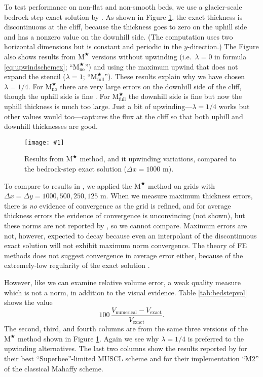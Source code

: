 \documentclass[twocolumn,letterpaper]{igs}
\newcommand{\onecol}[1]{\texttt{[image: \#1]}}
\newcommand{\Mstar}{$\text{M}^{\bigstar}$\xspace}
\newcommand{\Mstarnoup}{$\text{M}^{\bigstar}_{\text{no}}$\xspace}
\newcommand{\Mstarfullup}{$\text{M}^{\bigstar}_{\text{full}}$\xspace}
\begin{document}
To test performance on non-flat and non-smooth beds, we use a glacier-scale bedrock-step exact solution by \cite{JaroschSchoofAnslow2013}.  As shown in Figure \ref{fig:bedstepprofiles}, the exact thickness is discontinuous at the cliff, because the thickness goes to zero on the uphill side and has a nonzero value on the downhill side.  (The computation uses two horizontal dimensions but is constant and periodic in the $y$-direction.)  The Figure also shows results from \Mstar versions without upwinding (i.e.~$\lambda=0$ in formula \eqref{eq:upwindschemex}; ``\Mstarnoup'') and using the maximum upwind that does not expand the stencil ($\lambda=1$; ``\Mstarfullup'').  These results explain why we have chosen $\lambda=1/4$.  For \Mstarnoup there are very large errors on the downhill side of the cliff, though the uphill side is fine \citep{JaroschSchoofAnslow2013}.  For \Mstarfullup the downhill side is fine but now the uphill thickness is much too large.  Just a bit of upwinding---$\lambda=1/4$ works but other values would too---captures the flux at the cliff so that both uphill and downhill thicknesses are good.

\begin{figure}[ht]
\onecol{bedstepprofiles.pdf}
\caption{Results from \Mstar method, and it upwinding variations, compared to the bedrock-step exact solution ($\Delta x=1000$ m).}
\label{fig:bedstepprofiles}
\end{figure}

To compare to results in \citep{JaroschSchoofAnslow2013}, we applied the \Mstar method on grids with $\Delta x=\Delta y = 1000,500,250,125$ m.  When we measure maximum thickness errors, there is \emph{no} evidence of convergence as the grid is refined, and for average thickness errors the evidence of convergence is unconvincing (not shown), but these norms are not reported by \cite{JaroschSchoofAnslow2013}, so we cannot compare.  Maximum errors are not, however, expected to decay because even an interpolant of the discontinuous exact solution will not exhibit maximum norm convergence.  The theory of FE methods does not suggest convergence in average error either, because of the extremely-low regularity of the exact solution \citep{Elmanetal2005}.

However, like \cite{JaroschSchoofAnslow2013} we can examine relative volume error, a weak quality measure which is not a norm, in addition to the visual evidence.  Table \ref{tab:bedstepvol} shows the value
\begin{equation}
100\, \frac{V_{\text{numerical}} - V_{\text{exact}}}{V_{\text{exact}}}.
\end{equation}
The second, third, and fourth columns are from the same three versions of the \Mstar method shown in Figure \ref{fig:bedstepprofiles}.  Again we see why $\lambda=1/4$ is preferred to the upwinding alternatives.  The last two columns show the results reported by \cite{JaroschSchoofAnslow2013} for their best ``Superbee''-limited MUSCL scheme and for their implementation ``M2'' of the classical Mahaffy scheme.
\end{document}
